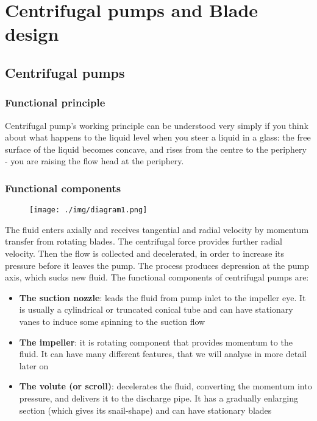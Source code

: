\chapter{Centrifugal pumps and Blade design}
\section{Centrifugal pumps}
\subsection{Functional principle}
Centrifugal pump's working principle can be understood very simply if you think about what happens to the liquid level when you steer a liquid in a glass: the free surface of the liquid becomes concave, and rises from the centre to the periphery - you are raising the flow head at the periphery.
\subsection{Functional components}
\begin{figure}[H]
  \centering
  \texttt{[image: ./img/diagram1.png]}
\end{figure}
The fluid enters axially and receives tangential and radial velocity by momentum transfer from rotating blades. The centrifugal force provides further radial velocity. Then the flow is collected and decelerated, in order to increase its pressure before it leaves the pump. The process produces depression at the pump axis, which sucks new fluid. The functional components of centrifugal pumps are:
\begin{itemize}
  \item \textbf{The suction nozzle}: leads the fluid from pump inlet to the impeller eye. It is usually a cylindrical or truncated conical tube and can have stationary vanes to induce some spinning to the suction flow
  \item \textbf{The impeller}: it is rotating component that provides momentum to the fluid. It can have many different features, that we will analyse in more detail later on
  \item \textbf{The volute (or scroll)}: decelerates the fluid, converting the momentum into pressure, and delivers it to the discharge pipe. It has a gradually enlarging section (which gives its snail-shape) and can have stationary blades
\end{itemize}

